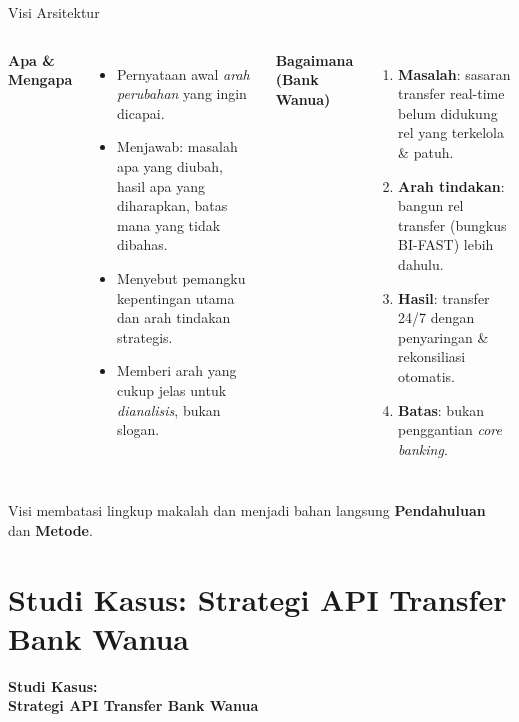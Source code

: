 \documentclass[aspectratio=169, table]{beamer}
\newcommand{\sectionframe}[1]{%
  \begin{frame}{\hfill}
    \centering
    \Huge{\textbf{#1}}
  \end{frame}
}
\newcommand{\takeaway}[1]{%
  \vspace{4pt}
  {\footnotesize #1}
}
\begin{document}
\begin{frame}{Visi Arsitektur}
  \vspace{2pt}
  \footnotesize
  \begin{columns}[t]
    \textbf{Apa \& Mengapa}
    \begin{itemize}\setlength{\itemsep}{2.5pt}
      \item Pernyataan awal \emph{arah perubahan} yang ingin dicapai.
      \item Menjawab: masalah apa yang diubah, hasil apa yang diharapkan, batas
            mana yang tidak dibahas.
      \item Menyebut pemangku kepentingan utama dan arah tindakan strategis.
      \item Memberi arah yang cukup jelas untuk \emph{dianalisis}, bukan slogan.
    \end{itemize}
    \textbf{Bagaimana (Bank Wanua)}
    \begin{enumerate}\setlength{\itemsep}{2.5pt}
      \item \textbf{Masalah}: sasaran transfer real-time belum didukung rel yang
            terkelola \& patuh.
      \item \textbf{Arah tindakan}: bangun rel transfer (bungkus BI-FAST) lebih
            dahulu.
      \item \textbf{Hasil}: transfer 24/7 dengan penyaringan \& rekonsiliasi
            otomatis.
      \item \textbf{Batas}: bukan penggantian \emph{core banking}.
    \end{enumerate}
  \end{columns}
  \vspace{2pt}
  \takeaway{Visi membatasi lingkup makalah dan menjadi bahan langsung
  \textbf{Pendahuluan} dan \textbf{Metode}.}
\end{frame}

\section{Studi Kasus: Strategi API Transfer Bank Wanua}
\sectionframe{Studi Kasus:\\ Strategi API Transfer Bank Wanua}
\end{document}
